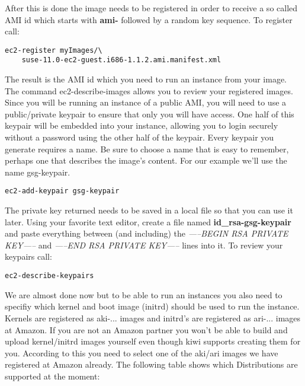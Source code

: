 After this is done the image needs to be registered in order to
receive a so called AMI id which starts with \textbf{ami-} followed
by a random key sequence. To register call:

\begin{Command}{13cm}
\begin{verbatim}
ec2-register myImages/\
    suse-11.0-ec2-guest.i686-1.1.2.ami.manifest.xml
\end{verbatim}
\end{Command}

The result is the AMI id which you need to run an instance from
your image. The command ec2-describe-images allows you to review your
registered images. Since you will be running an instance of a public AMI,
you will need to use a public/private keypair to ensure that only you
will have access. One half of this keypair will be embedded into your
instance, allowing you to login securely without a password using the
other half of the keypair. Every keypair you generate requires a name.
Be sure to choose a name that is easy to remember, perhaps one that
describes the image's content. For our example we'll use the name
gsg-keypair.

\begin{Command}{10cm}
\begin{verbatim}
ec2-add-keypair gsg-keypair
\end{verbatim}
\end{Command}

The private key returned needs to be saved in a local file so that
you can use it later. Using your favorite text editor, create a file
named \textbf{id\_rsa-gsg-keypair} and paste everything between
(and including) the \textit{-----BEGIN RSA PRIVATE KEY-----} and
\textit{-----END RSA PRIVATE KEY-----} lines into it. To review
your keypairs call:

\begin{Command}{10cm}
\begin{verbatim}
ec2-describe-keypairs
\end{verbatim}
\end{Command}

We are almost done now but to be able to run an instances you also need
to specifiy which kernel and boot image (initrd) should be used to run
the instance. Kernels are registered as aki-... images and initrd's
are registered as ari-... images at Amazon. If you are not an Amazon
partner you won't be able to build and upload kernel/initrd images
yourself even though kiwi supports creating them for you. According
to this you need to select one of the aki/ari images we have registered
at Amazon already. The following table shows which Distributions are
supported at the moment:\\


